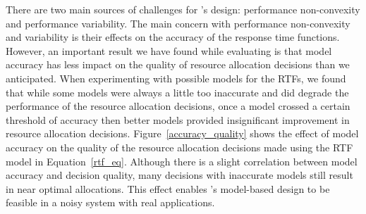 There are two main sources of challenges for \pacora's design: performance non-convexity and performance variability. 
The main concern with performance non-convexity and variability is their effects on the accuracy of the response time functions.  However, an important result we have found while evaluating \pacora is that model accuracy has less impact on the quality of resource allocation decisions than we anticipated.  When experimenting with possible models for the RTFs, we found that while some models were always a little too inaccurate and did degrade the performance of the resource allocation decisions, once a model crossed a certain threshold of accuracy then better models provided insignificant improvement in resource allocation decisions. Figure~\ref{accuracy_quality} shows the effect of model accuracy on the quality of the resource allocation decisions made using the RTF model in Equation~\ref{rtf_eq}.  Although there is a slight correlation between model accuracy and decision quality, many decisions with inaccurate models still result in near optimal allocations.  This effect enables \pacora's model-based design to be feasible in a noisy system with real applications.

